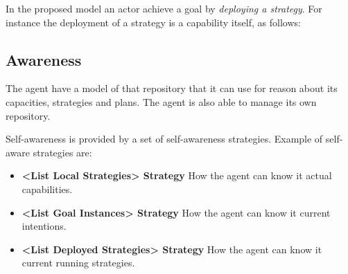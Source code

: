 In the proposed model an actor achieve a goal by \emph{deploying a strategy}. For instance the deployment of a strategy is a capability itself, as follows:



\subsection{Awareness}

The agent have a model of that repository that it can use for reason about its capacities, strategies and plans. The agent is also able to manage its own repository.

Self-awareness is provided by a set of self-awareness strategies. Example of self-aware strategies are:

\begin{itemize}
  \item \textbf{<List Local Strategies> Strategy} How the agent can know it actual capabilities.

  \item \textbf{<List Goal Instances> Strategy} How the agent can know it current intentions.

  \item \textbf{<List Deployed Strategies> Strategy} How the agent can know it current running strategies.

\end{itemize}


%
%
%
%
%
%
%
